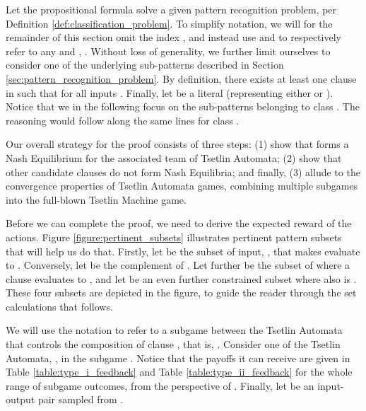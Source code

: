 \documentclass[11pt,a4paper]{article}
\begin{document}
Let the propositional formula  solve a given pattern recognition problem, per Definition \ref{def:classification_problem}. To simplify notation, we will for the remainder of this section omit the index , and instead use  and  to respectively refer to any  and , . Without loss of generality, we further limit ourselves to consider one of the underlying sub-patterns  described in Section \ref{sec:pattern_recognition_problem}. By definition, there exists at least one clause   in  such that  for all inputs . Finally, let  be a literal (representing either  or ). Notice that we in the following focus on the sub-patterns belonging to class . The reasoning would follow along the same lines for class .

Our overall strategy for the proof consists of three steps: (1) show that  forms a Nash Equilibrium for the associated team of Tsetlin Automata; (2) show that other candidate clauses  do not form Nash Equilibria; and finally, (3) allude to the convergence properties of Tsetlin Automata games, combining multiple subgames into the full-blown Tsetlin Machine game.

Before we can complete the proof, we need to derive the expected reward of the actions. Figure \ref{figure:pertinent_subsets} illustrates pertinent pattern subsets that will help us do that. Firstly, let  be the subset of input, , that makes  evaluate to . Conversely, let  be the complement of . Let further  be the subset of  where a clause  evaluates to , and let  be an even further constrained subset where  also is . These four subsets are depicted in the figure, to guide the reader through the set calculations that follows.

We will use the notation  to refer to a subgame between the Tsetlin Automata that controls the composition of clause , that is, . Consider one of the Tsetlin Automata, , in the subgame . Notice that the payoffs it can receive are given in Table \ref{table:type_i_feedback} and Table \ref{table:type_ii_feedback} for the  whole range of subgame  outcomes, from the perspective of . Finally, let  be an input-output pair sampled from . 
\end{document}
